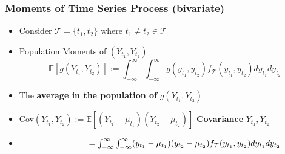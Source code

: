 \documentclass{beamer}
\begin{document}
		\begin{frame}
			\frametitle{Moments of Time Series Process (bivariate)}
			\begin{itemize}
				
				\large
				\item[] Consider $\mathcal{T}=\{t_1,t_2\}$ where $t_1\neq t_2 \in \mathcal{T}$ 	\vspace{8pt}
				
				\item[]\begin{myexx*}[width=5.4in]{Population Moments of $(Y_{t_1},Y_{t_2})$}
					\begin{equation*}\mathbb{E}[g(Y_{t_1},Y_{t_2})] := \int_{-\infty}^{\infty}\int_{-\infty}^{\infty} g(y_{t_1},y_{t_2}) f_{\mathcal{T}}(y_{t_1},y_{t_2})dy_{t_1}dy_{t_2}  \end{equation*}
				\end{myexx*}
				\pause
				\item[] The \textbf{average in the population of} $g(Y_{t_1}, Y_{t_2})$
					\vspace{10pt}
			
				
			
				\vspace{15pt}
				
				\pause
				\item[]\hspace{29pt} Cov$(Y_{t_1},Y_{t_2}):=\mathbb{E}[(Y_{t_1}-\mu_{t_1})(Y_{t_2}-\mu_{t_2})]$ \hspace{10pt} \textbf{Covariance}  $Y_{t_1},Y_{t_2}$
				\vspace{10pt}\pause
				\item[]$\hspace{81.2pt} = \int_{-\infty}^{\infty}\int_{-\infty}^{\infty} (y_{t_1}-\mu_{t_1})(y_{t_2}-\mu_{t_2}) f_{\mathcal{T}}(y_{t_1},y_{t_2})dy_{t_1}dy_{t_2} $
				
				
			\end{itemize}
		\end{frame}
		
		
		
		
		
		
		
\end{document}
